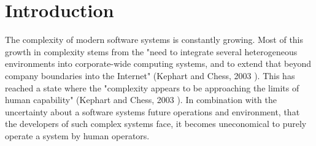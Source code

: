 \newpage
\section{Introduction}
\label{ch:Introduction}




\par
The complexity of modern software systems is constantly growing.
Most of this growth in complexity stems from the 
"need to integrate several heterogeneous environments into corporate-wide computing systems, 
and to extend that beyond company boundaries into the Internet" (Kephart and Chess, 2003 \cite*{VisionOfAutonomicComputing}).
\newline
This has reached a state where the 
"complexity appears to be approaching the limits of human capability" (Kephart and Chess, 2003 \cite*{VisionOfAutonomicComputing}).
In combination with the uncertainty about a software systems future operations and environment,
that the developers of such complex systems face, it becomes uneconomical to purely operate a system by human operators.
\newline
\par


